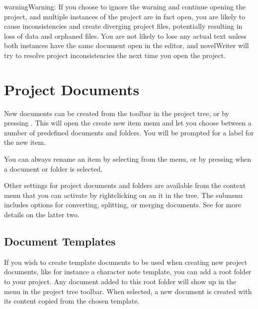\documentclass[a4paper,11pt,english]{sphinxmanual}
\begin{document}
\begin{sphinxadmonition}{warning}{Warning:}
\sphinxAtStartPar
If you choose to ignore the warning and continue opening the project, and multiple instances of
the project are in fact open, you are likely to cause inconsistencies and create diverging
project files, potentially resulting in loss of data and orphaned files. You are not likely to
lose any actual text unless both instances have the same document open in the editor, and
novelWriter will try to resolve project inconsistencies the next time you open the project.
\end{sphinxadmonition}


\section{Project Documents}
\label{\detokenize{project_overview:project-documents}}\label{\detokenize{project_overview:a-proj-files}}
\sphinxAtStartPar
New documents can be created from the toolbar in the project tree, or by pressing .
This will open the create new item menu and let you choose between a number of pre\sphinxhyphen{}defined
documents and folders. You will be prompted for a label for the new item.

\sphinxAtStartPar
You can always rename an item by selecting  from the  menu, or by
pressing  when a document or folder is selected.

\sphinxAtStartPar
Other settings for project documents and folders are available from the context menu that you can
activate by right\sphinxhyphen{}clicking on an it in the tree. The  submenu includes options for
converting, splitting, or merging documents. See {\hyperref[\detokenize{usage_project:a-ui-tree-split-merge}]{}} for more details on
the latter two.


\subsection{Document Templates}
\label{\detokenize{project_overview:document-templates}}
\sphinxAtStartPar
If you wish to create template documents to be used when creating new project documents, like for
instance a character note template, you can add a  root folder to your project. Any
document added to this root folder will show up in the  menu in the project tree
toolbar. When selected, a new document is created with its content copied from the chosen template.
\end{document}
